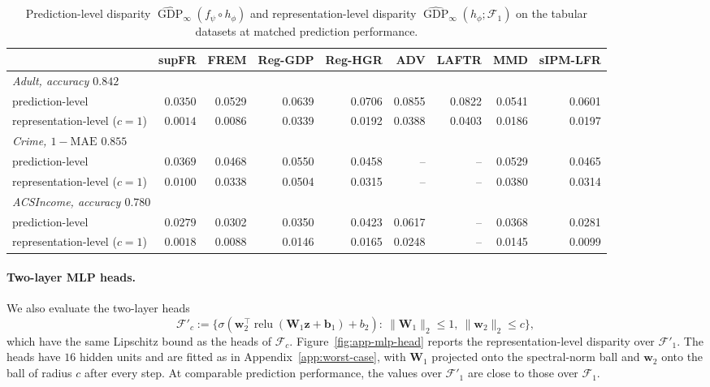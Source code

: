 \documentclass{article} %
\begin{document}
\begin{table}[H]
\centering
\caption{Prediction-level disparity $\widehat{\operatorname{GDP}}_{\infty}(f_{\psi}\circ h_{\phi})$ and representation-level disparity $\widehat{\operatorname{GDP}}_{\infty}(h_{\phi};\mathcal{F}_1)$ on the tabular datasets at matched prediction performance.}
\label{tab:matched}
\footnotesize
\setlength{\tabcolsep}{3pt}
\begin{tabular}{lrrrrrrrr}
\toprule
 & supFR & FREM & Reg-GDP & Reg-HGR & ADV & LAFTR & MMD & sIPM-LFR \\
\midrule
\multicolumn{9}{l}{\emph{Adult, accuracy $0.842$}} \\
prediction-level & $\mathbf{0.0350}$ & 0.0529 & 0.0639 & 0.0706 & 0.0855 & 0.0822 & 0.0541 & 0.0601 \\
representation-level ($c=1$) & $\mathbf{0.0014}$ & 0.0086 & 0.0339 & 0.0192 & 0.0388 & 0.0403 & 0.0186 & 0.0197 \\
\midrule
\multicolumn{9}{l}{\emph{Crime, $1-\mathrm{MAE}$ $0.855$}} \\
prediction-level & $\mathbf{0.0369}$ & 0.0468 & 0.0550 & 0.0458 & -- & -- & 0.0529 & 0.0465 \\
representation-level ($c=1$) & $\mathbf{0.0100}$ & 0.0338 & 0.0504 & 0.0315 & -- & -- & 0.0380 & 0.0314 \\
\midrule
\multicolumn{9}{l}{\emph{ACSIncome, accuracy $0.780$}} \\
prediction-level & $\mathbf{0.0279}$ & 0.0302 & 0.0350 & 0.0423 & 0.0617 & -- & 0.0368 & 0.0281 \\
representation-level ($c=1$) & $\mathbf{0.0018}$ & 0.0088 & 0.0146 & 0.0165 & 0.0248 & -- & 0.0145 & 0.0099 \\
\bottomrule
\end{tabular}
\end{table}

\paragraph{Two-layer MLP heads.}  We also evaluate the two-layer heads
\begin{equation*}
  \mathcal{F}'_c:=\bigl\{\sigma(\mathbf{w}_2^{\top}\operatorname{relu}(\mathbf{W}_1\mathbf{z}+\mathbf{b}_1)+b_2):\ \lVert\mathbf{W}_1\rVert_2\le1,\ \lVert\mathbf{w}_2\rVert_2\le c\bigr\},
\end{equation*}
which have the same Lipschitz bound as the heads of $\mathcal{F}_c$.  Figure~\ref{fig:app-mlp-head} reports the representation-level disparity over $\mathcal{F}'_1$.  The heads have $16$ hidden units and are fitted as in Appendix~\ref{app:worst-case}, with $\mathbf{W}_1$ projected onto the spectral-norm ball and $\mathbf{w}_2$ onto the ball of radius $c$ after every step.  At comparable prediction performance, the values over $\mathcal{F}'_1$ are close to those over $\mathcal{F}_1$.
\end{document}
